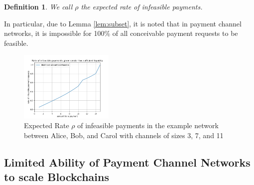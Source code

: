 \documentclass[10pt,twocolumn]{article}
\newtheorem{definition}{Definition}[section]
\begin{document}
\begin{definition}
  We call $\rho$ the expected rate of infeasible payments.
\end{definition}

In particular, due to Lemma \ref{lem:subset}, it is noted that in payment channel networks, it is impossible for 100\% of all conceivable payment requests to be feasible.  

\begin{figure}[h]
\centering
 \includegraphics[width=0.40\textwidth]{rateofinfeasible}

\caption{Expected Rate \(\rho\) of infeasible payments in the example network between Alice, Bob, and Carol with channels of sizes 3, 7, and 11}
\label{fig:infeasible}
\end{figure}



\subsection{Limited Ability of Payment Channel Networks to scale Blockchains}
\end{document}

